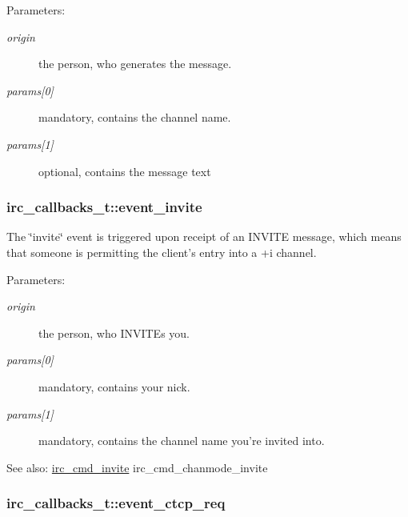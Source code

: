\begin{Desc}
\item[Parameters:]
\begin{description}
\item[{\em origin}]the person, who generates the message. \item[{\em params\mbox{[}0\mbox{]}}]mandatory, contains the channel name. \item[{\em params\mbox{[}1\mbox{]}}]optional, contains the message text \end{description}
\end{Desc}
\hypertarget{structirc__callbacks__t_e5f3325ab13c3a36ed84435e3bcf7b61}{
\subsubsection[event\_\-invite]{ {\bf irc\_\-callbacks\_\-t::event\_\-invite}}}
\label{structirc__callbacks__t_e5f3325ab13c3a36ed84435e3bcf7b61}


The \char`\"{}invite\char`\"{} event is triggered upon receipt of an INVITE message, which means that someone is permitting the client's entry into a +i channel.

\begin{Desc}
\item[Parameters:]
\begin{description}
\item[{\em origin}]the person, who INVITEs you. \item[{\em params\mbox{[}0\mbox{]}}]mandatory, contains your nick. \item[{\em params\mbox{[}1\mbox{]}}]mandatory, contains the channel name you're invited into.\end{description}
\end{Desc}
\begin{Desc}
\item[See also:]\hyperlink{libircclient_8h_77e2b2c46c8883a7986180f36ca17247}{irc\_\-cmd\_\-invite} irc\_\-cmd\_\-chanmode\_\-invite \end{Desc}
\hypertarget{structirc__callbacks__t_5f5d386a4df0d1334ffb96b3c406355f}{
\subsubsection[event\_\-ctcp\_\-req]{ {\bf irc\_\-callbacks\_\-t::event\_\-ctcp\_\-req}}}
\label{structirc__callbacks__t_5f5d386a4df0d1334ffb96b3c406355f}


